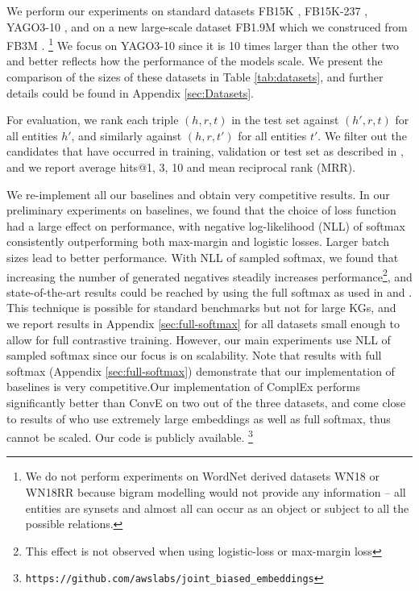 \documentclass[11pt,a4paper, dvipsnames]{article}
\begin{document}
We perform our experiments on standard datasets FB15K \citep{Bordes2013TranslatingData}, FB15K-237 \citep{Toutanova2015RepresentingBases}, YAGO3-10 \citep{Dettmers2018ConvolutionalEmbeddings}, and on a new large-scale dataset FB1.9M which we construced from FB3M \citep{Xu2018InvestigationsExtraction}. \footnote{We do not perform experiments on WordNet derived datasets WN18 or WN18RR because bigram modelling would not provide any information -- all entities are synsets and almost all can occur as an object or subject to all the possible relations.} We focus on YAGO3-10 since it is 10 times larger than the other two and better reflects how the performance of the models scale. We present the comparison of the sizes of these datasets in Table \ref{tab:datasets}, and further details could be found in Appendix \ref{sec:Datasets}. 

For evaluation, we rank each triple $(h, r, t)$ in the test set
against $(h', r, t)$ for all entities $h'$, and similarly against $(h, r, t')$ for all entities $t'$. We filter out the candidates that have occurred in training, validation or test set as described in \citet{Bordes2013TranslatingData}, and we report average hits@1, 3, 10 and mean reciprocal rank (MRR). 
 


We re-implement all our baselines and obtain very competitive results. In our preliminary experiments on baselines, we found that the choice of loss function had a large effect on performance, with negative log-likelihood (NLL) of softmax consistently outperforming both max-margin and logistic losses. Larger batch sizes lead to better performance. With NLL of sampled softmax, we found that increasing the number of generated negatives steadily increases performance\footnote{This effect is not observed when using logistic-loss or max-margin loss}, and state-of-the-art results could be reached by using the full softmax as used in \citet{Joulin2017FastEmbeddings} and \citet{Lacroix2018CanonicalCompletion}. This technique is possible for standard benchmarks but not for large KGs, and we report results in Appendix \ref{sec:full-softmax} 
for all datasets small enough to allow for full contrastive training. However, our main experiments use NLL of sampled softmax since our focus is on scalability. Note that results with full softmax (Appendix \ref{sec:full-softmax}) demonstrate that our implementation of baselines is very competitive.Our implementation of ComplEx performs significantly better than ConvE \citep{Dettmers2018ConvolutionalEmbeddings} on two out of the three datasets, and come close to results of \citet{Lacroix2018CanonicalCompletion} who use extremely large embeddings as well as full softmax, thus cannot be scaled. Our code is publicly available. \footnote{\tiny{{\tt  https://github.com/awslabs/joint\_biased\_embeddings}}}
\end{document}

